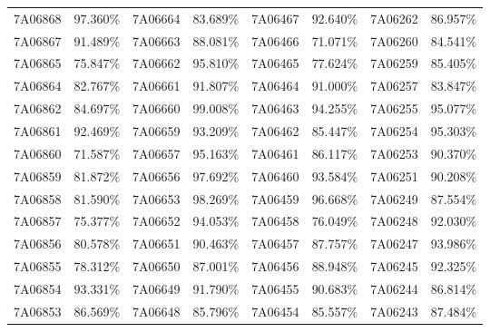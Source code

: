 \documentclass[12pt]{article}%
\begin{document}
\begin{longtable}{|cc|cc|cc|cc|}
7A06868              & 97.360\% & 7A06664              & 83.689\% & 7A06467              & 92.640\% & \multicolumn{1}{l}{7A06262             } & 86.957\% \\
7A06867              & 91.489\% & 7A06663              & 88.081\% & 7A06466              & 71.071\% & \multicolumn{1}{l}{7A06260             } & 84.541\% \\
7A06865              & 75.847\% & 7A06662              & 95.810\% & 7A06465              & 77.624\% & \multicolumn{1}{l}{7A06259             } & 85.405\% \\
7A06864              & 82.767\% & 7A06661              & 91.807\% & 7A06464              & 91.000\% & \multicolumn{1}{l}{7A06257             } & 83.847\% \\
7A06862              & 84.697\% & 7A06660              & 99.008\% & 7A06463              & 94.255\% & \multicolumn{1}{l}{7A06255             } & 95.077\% \\
7A06861              & 92.469\% & 7A06659              & 93.209\% & 7A06462              & 85.447\% & \multicolumn{1}{l}{7A06254             } & 95.303\% \\
7A06860              & 71.587\% & 7A06657              & 95.163\% & 7A06461              & 86.117\% & \multicolumn{1}{l}{7A06253             } & 90.370\% \\
7A06859              & 81.872\% & 7A06656              & 97.692\% & 7A06460              & 93.584\% & \multicolumn{1}{l}{7A06251             } & 90.208\% \\
7A06858              & 81.590\% & 7A06653              & 98.269\% & 7A06459              & 96.668\% & \multicolumn{1}{l}{7A06249             } & 87.554\% \\
7A06857              & 75.377\% & 7A06652              & 94.053\% & 7A06458              & 76.049\% & \multicolumn{1}{l}{7A06248             } & 92.030\% \\
7A06856              & 80.578\% & 7A06651              & 90.463\% & 7A06457              & 87.757\% & \multicolumn{1}{l}{7A06247             } & 93.986\% \\
7A06855              & 78.312\% & 7A06650              & 87.001\% & 7A06456              & 88.948\% & \multicolumn{1}{l}{7A06245             } & 92.325\% \\
7A06854              & 93.331\% & 7A06649              & 91.790\% & 7A06455              & 90.683\% & \multicolumn{1}{l}{7A06244             } & 86.814\% \\
7A06853              & 86.569\% & 7A06648              & 85.796\% & 7A06454              & 85.557\% & \multicolumn{1}{l}{7A06243             } & 87.484\% \\

\end{longtable}
\end{document}
